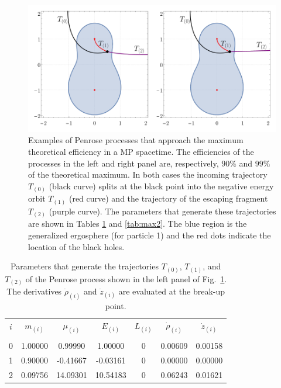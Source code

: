\begin{figure}[!ht]
  \centering
  \includegraphics[width=\linewidth]{img/penrose_binaries/fig11.pdf}
  \caption{Examples of Penrose processes that approach the maximum theoretical efficiency in a MP spacetime. The efficiencies of the processes in the left and right panel are, respectively, $90 \%$ and $99 \%$ of the theoretical maximum. In both cases the incoming trajectory $T_{(0)}$ (black curve) splits at the black point into the negative energy orbit $T_{(1)}$ (red curve) and the trajectory of the escaping fragment $T_{(2)}$ (purple curve). The parameters that generate these trajectories are shown in Tables \ref{tab:max1} and \ref{tab:max2}. The blue region is the generalized ergosphere (for particle 1) and the red dots indicate the location of the black holes.}
  \label{fig:examplemax1}
\end{figure}

\begin{table}[h]
  \centering
  \begin{tabular}{ccccccc}
    \hline\hline
    $i$ & $m_{(i)}$ & $\mu_{(i)}$ & $E_{(i)}$ & $L_{(i)}$ & $\dot{\rho}_{(i)}$ & $\dot{z}_{(i)}$ \\ \vspace{-0.3cm} \\
    0   & 1.00000   & 0.99990     & 1.00000   & 0         & 0.00609            & 0.00158         \\
    1   & 0.90000   & -0.41667    & -0.03161  & 0         & 0.00000            & 0.00000         \\
    2   & 0.09756   & 14.09301    & 10.54183  & 0         & 0.06243            & 0.01621         \\
    \hline\hline
  \end{tabular}
  \caption{Parameters that generate the trajectories $T_{(0)}$, $T_{(1)}$, and $T_{(2)}$ of the Penrose process shown in the left panel of Fig.~\ref{fig:examplemax1}. The derivatives $\dot{\rho}_{(i)}$ and $\dot{z}_{(i)}$ are evaluated at the break-up point.
  }
  \label{tab:max1}
\end{table}

